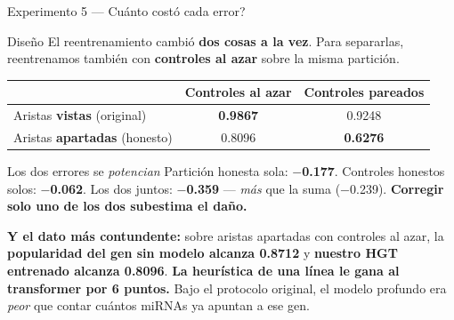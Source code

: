 \begin{frame}{Experimento 5 --- \textquestiondown{}Cu\'anto cost\'o cada error?}
  \begin{block}{Dise\~no}
    \scriptsize
    El reentrenamiento cambi\'o \textbf{dos cosas a la vez}. Para separarlas, reentrenamos tambi\'en con \textbf{controles al azar} sobre la misma partici\'on.
  \end{block}

  \vspace{0.2em}
  \centering
  \small
  \begin{tabular}{lcc}
    \toprule
     & \textbf{Controles al azar} & \textbf{Controles pareados} \\
    \midrule
    Aristas \textbf{vistas} (original) & \textbf{0.9867} & 0.9248 \\
    Aristas \textbf{apartadas} (honesto) & 0.8096 & \textbf{0.6276} \\
    \bottomrule
  \end{tabular}

  \vspace{0.4em}
  \raggedright
  \begin{block}{Los dos errores se \emph{potencian}}
    \scriptsize
    Partici\'on honesta sola: \textbf{$-$0.177}. Controles honestos solos: \textbf{$-$0.062}. Los dos juntos: \textbf{$-$0.359} --- \emph{m\'as} que la suma ($-$0.239). \textbf{Corregir solo uno de los dos subestima el da\~no.}

    \vspace{0.3em}
    \textbf{Y el dato m\'as contundente:} sobre aristas apartadas con controles al azar, la \textbf{popularidad del gen sin modelo alcanza 0.8712} y \textbf{nuestro HGT entrenado alcanza 0.8096}. \textbf{La heur\'istica de una l\'inea le gana al transformer por 6 puntos.} Bajo el protocolo original, el modelo profundo era \emph{peor} que contar cu\'antos miRNAs ya apuntan a ese gen.
  \end{block}
\end{frame}


